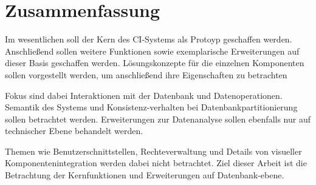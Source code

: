 \section{Zusammenfassung}


Im wesentlichen soll der Kern des CI-Systems als Protoyp geschaffen werden.
Anschließend sollen weitere Funktionen sowie exemplarische Erweiterungen
auf dieser Basis geschaffen werden.
L\"osungskonzepte f\"ur die einzelnen Komponenten sollen vorgestellt werden,
um anschließend ihre Eigenschaften zu betrachten

Fokus sind dabei Interaktionen mit der Datenbank und Datenoperationen.
Semantik des Systems und Konsistenz-verhalten bei Datenbankpartitionierung
sollen betrachtet werden. Erweiterungen zur Datenanalyse sollen ebenfalls nur auf technischer Ebene behandelt werden.

Themen wie Benutzerschnittstellen, Rechteverwaltung und Details
von visueller Komponentenintegration werden dabei nicht betrachtet.
Ziel dieser Arbeit ist die Betrachtung der Kernfunktionen und Erweiterungen auf Datenbank-ebene.

